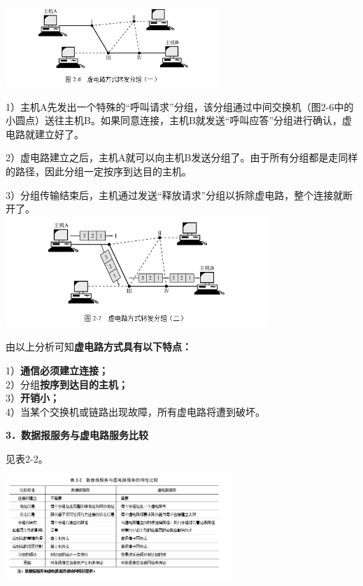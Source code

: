 \includegraphics[width=3.18750in,height=1.20833in]{png-jpeg-pics/D2FBE3A39101979D224FC209707A4654.png}

1）主机A先发出一个特殊的``呼叫请求''分组，该分组通过中间交换机（图2-6中的小圆点）送往主机B。如果同意连接，主机B就发送``呼叫应答''分组进行确认，虚电路就建立好了。

2）虚电路建立之后，主机A就可以向主机B发送分组了。由于所有分组都是走同样的路径，因此分组一定按序到达目的主机。

3）分组传输结束后，主机通过发送``释放请求''分组以拆除虚电路，整个连接就断开了。\\
\includegraphics[width=3.90625in,height=1.65625in]{png-jpeg-pics/D4D6AC5E1F36D4650BC26427C569970B.png}

由以上分析可知\textbf{虚电路方式具有以下特点：}

1）\textbf{通信必须建立连接；}\\
2）分组\textbf{按序到达目的主机；}\\
3）\textbf{开销小；}\\
4）当某个交换机或链路出现故障，所有虚电路将遭到破坏。

{\textbf{{3．数据报服务与虚电路服务比较}}}

见表2-2。

\includegraphics[width=3.37500in,height=1.56250in]{png-jpeg-pics/C10B967B07F6EA214328B987CE4557D1.png}
